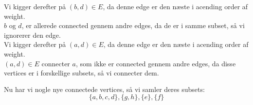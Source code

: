 \documentclass[a4paper,12pt]{article}
\begin{document}
Vi kigger derefter på $(b,d)\in E$, da denne edge er den næste i acending order af weight.\\
$b$ og $d$, er allerede connected gennem andre edges, da de er i samme subset, så vi ignorerer den edge.\\
Vi kigger derefter på $(a,d)\in E$, da denne edge er den næste i acending order af weight.\\
$(a,d)\in E$ connecter $a$, som ikke er connected gennem andre edges, da disse vertices er i forskellige subsets, så vi connecter dem.
\begin{figure}[H]
    \centering
    \caption*{}
\end{figure}
Nu har vi nogle nye connectede vertices, så vi samler deres subsets:
\[\{a,b,c,d\},\{g,h\},\{e\},\{f\}\]
\end{document}
